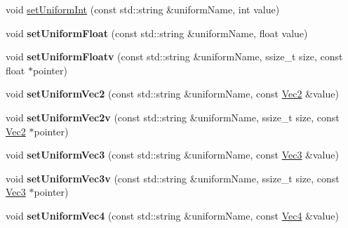 \textbf{ }\par
\begin{DoxyCompactItemize}
\item 
void \hyperlink{classGLProgramState_a7de1ddee54075d6279b8defcdcd33578}{set\+Uniform\+Int} (const std\+::string \&uniform\+Name, int value)
\item 
\mbox{\label{classGLProgramState_a37692ba572e3aacb7588c89b3ff16cf6}} 
void {\bfseries set\+Uniform\+Float} (const std\+::string \&uniform\+Name, float value)
\item 
\mbox{\label{classGLProgramState_a187cac4c543cb0e1684ecb7f2e7a40c7}} 
void {\bfseries set\+Uniform\+Floatv} (const std\+::string \&uniform\+Name, ssize\+\_\+t size, const float $\ast$pointer)
\item 
\mbox{\label{classGLProgramState_a41e272a65d9d8abe4a45228d3be99acf}} 
void {\bfseries set\+Uniform\+Vec2} (const std\+::string \&uniform\+Name, const \hyperlink{classVec2}{Vec2} \&value)
\item 
\mbox{\label{classGLProgramState_aed7172f9d06375c8f6902b2b2c451674}} 
void {\bfseries set\+Uniform\+Vec2v} (const std\+::string \&uniform\+Name, ssize\+\_\+t size, const \hyperlink{classVec2}{Vec2} $\ast$pointer)
\item 
\mbox{\label{classGLProgramState_aa2ed326e2b82c143c3751a0d99a5071c}} 
void {\bfseries set\+Uniform\+Vec3} (const std\+::string \&uniform\+Name, const \hyperlink{classVec3}{Vec3} \&value)
\item 
\mbox{\label{classGLProgramState_a32101794108848a9a3695530cb060e3d}} 
void {\bfseries set\+Uniform\+Vec3v} (const std\+::string \&uniform\+Name, ssize\+\_\+t size, const \hyperlink{classVec3}{Vec3} $\ast$pointer)
\item 
\mbox{\label{classGLProgramState_ad48e35f99fd4f1aafd2103885662aff4}} 
void {\bfseries set\+Uniform\+Vec4} (const std\+::string \&uniform\+Name, const \hyperlink{classVec4}{Vec4} \&value)
\item 
\mbox{\label{classGLProgramState_a33cc95c198eb80df2ba3e8e3830613a6}} 

\end{DoxyCompactItemize}
